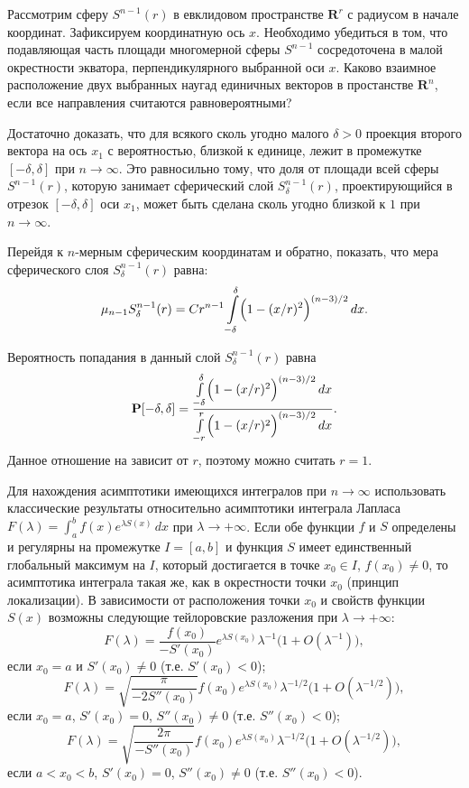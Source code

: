 \begin{problem}

Рассмотрим сферу $S^{n-1}(r)$ в евклидовом пространстве $\mathbf{R}^r$ с радиусом в начале координат. %
Зафиксируем координатную ось $x$.
Необходимо убедиться в том, что подавляющая часть площади многомерной сферы $S^{n-1}$ сосредоточена в малой окрестности экватора, перпендикулярного выбранной оси $x$. Каково взаимное расположение двух выбранных наугад единичных векторов в простанстве $\mathbf{R}^n$, если все направления считаются равновероятными?
\end{problem}


\begin{remark}
Достаточно доказать, что для всякого сколь угодно малого $\delta>0$ проекция второго вектора на ось $x_1$ с вероятностью, близкой к 
единице, лежит в промежутке $[-\delta, \delta]$ при $n\to\infty$. Это равносильно тому, что доля от площади всей сферы $S^{n-1}(r)$, 
которую занимает сферический слой $S^{n-1}_{\delta}(r)$, проектирующийся в отрезок $[-\delta, \delta]$ оси $x_1$, 
может быть сделана сколь угодно близкой к $1$ при $n\to\infty$. 

Перейдя к $n$-мерным сферическим координатам и обратно, показать, что мера сферического слоя $S^{n-1}_{\delta}(r)$ равна: 
$$
\mu_{n-1} S_{\delta}^{n-1}(r) = Cr^{n-1} 
\int\limits_{-\delta}^{\delta} \Bigl( 1-(x/r)^2\Bigr)^{(n-3)/2} \, dx . 
$$

Вероятность попадания в данный слой $S_{\delta}^{n-1}(r)$ равна 
$$
{\mathbf P}[-\delta, \delta]=\frac{\int\limits_{-\delta}^{\delta} \Bigl( 1-(x/r)^2\Bigr)^{(n-3)/2} \, dx}
{\int\limits_{-r}^{r} \Bigl( 1-(x/r)^2\Bigr)^{(n-3)/2} \, dx} . 
$$
Данное отношение на зависит от $r$, поэтому можно считать $r=1$. 

Для нахождения асимптотики имеющихся интегралов при $n\to\infty$ использовать классические результаты относительно асимптотики интеграла 
Лапласа $F(\lambda)=\int_a^b f(x)e^{\lambda S(x)}\, dx$ при $\lambda\to +\infty$. Если обе функции $f$ и $S$ определены и регулярны 
на промежутке $I=[a,b]$ и функция $S$ имеет единственный глобальный максимум на $I$, который достигается в точке $x_0\in I$, 
$f(x_0)\ne 0$, то асимптотика интеграла такая же, как в окрестности точки $x_0$ (принцип локализации). В зависимости от расположения 
точки $x_0$ и свойств функции $S(x)$ возможны следующие тейлоровские разложения при $\lambda\to +\infty$: 
$$
F(\lambda)=\frac{f(x_0)}{-S'(x_0)}e^{\lambda S(x_0)} \lambda^{-1}\bigl( 1+O(\lambda^{-1})\bigr) , 
$$
если $x_0=a$ и $S'(x_0)\ne 0$ (т.е. $S'(x_0)<0$); 
$$
F(\lambda)=\sqrt{\frac{\pi}{-2S''(x_0)}} f(x_0) e^{\lambda S(x_0)} \lambda^{-1/2}\bigl( 1+O(\lambda^{-1/2})\bigr) , 
$$
если $x_0=a$, $S'(x_0)=0$, $S''(x_0)\ne 0$ (т.е. $S''(x_0)<0$); 
$$
F(\lambda)=\sqrt{\frac{2\pi}{-S''(x_0)}} f(x_0) e^{\lambda S(x_0)} \lambda^{-1/2}\bigl( 1+O(\lambda^{-1/2})\bigr) , 
$$
если $a<x_0<b$, $S'(x_0)=0$, $S''(x_0)\ne 0$ (т.е. $S''(x_0)<0$). 

\end{remark}

